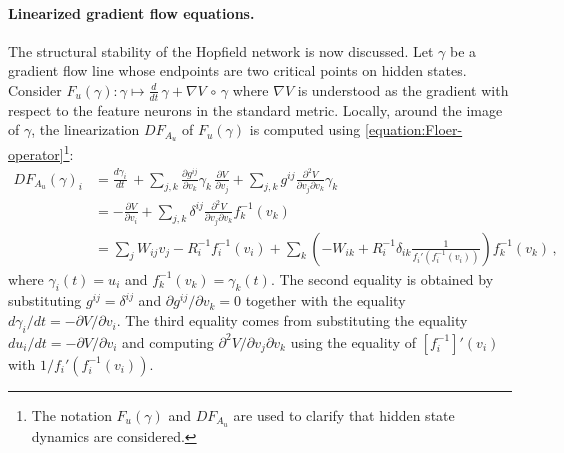 \documentclass[12pt]{article}
\begin{document}
\paragraph{Linearized gradient flow equations.}
The structural stability of the Hopfield network is now discussed. Let $\gamma$ be a gradient flow line whose endpoints are two critical points on hidden states. Consider $F_u(\gamma): \gamma \mapsto \frac{d}{dt} \, \gamma + \nabla V \, \circ \, \gamma$ where $\nabla V$ is understood as the gradient with respect to the feature neurons in the standard metric. Locally, around the image of $\gamma$, the linearization $DF_{A_{u}}$ of $F_u(\gamma)$ is computed using \eqref{equation:Floer-operator}\footnote{The notation $F_u(\gamma)$ and $DF_{A_{u}}$ are used to clarify that hidden state dynamics are considered.}: 
\begin{align*}
    DF_{A_{u}}(\gamma)_i &= \frac{d\gamma_i}{dt} \,  + \sum_{j,k} \frac{\partial g^{ij}}{\partial v_k} \gamma_k \, \frac{\partial V}{\partial v_j} + \sum_{j,k} g^{ij} \frac{\partial^2 V}{\partial v_j \partial v_k}\gamma_k \nonumber\\
    &= - \frac{\partial V}{\partial v_i} + \sum_{j,k}\delta^{ij}\frac{\partial^2 V}{\partial v_j \partial v_k}f^{-1}_k(v_k) \nonumber\\
    &= \sum_{j} W_{ij} v_j  - R^{-1}_{i} f_i^{-1}(v_i) + \sum_k \left( - W_{ik} + R^{-1}_{i } \delta_{ik}\frac{1}{f_i'(f_i^{-1}(v_i))} \right) f^{-1}_k(v_k) \, ,
\end{align*}
where $\gamma_i(t) = u_i$ and $f_k^{-1}(v_k) = \gamma_k(t)$. The second equality is obtained by substituting $g^{ij} = \delta^{ij}$ and $\partial g^{ij} / \partial v_k = 0$ together with the equality $d\gamma_i /dt = -\partial V/\partial v_i$. The third equality comes from substituting the equality $d{u_i}/dt = -\partial V/ \partial v_i$ and computing $\partial^2V/\partial v_j \partial v_k$ using the equality of $[f_i^{-1}]'(v_i)$ with $1/f_i'(f^{-1}_i(v_i))$.
\end{document}
